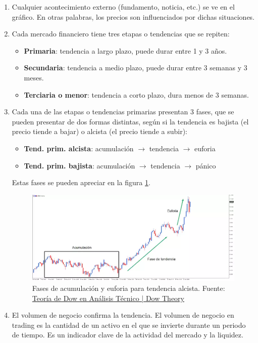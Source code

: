 \begin{enumerate}
	\item Cualquier acontecimiento externo (fundamento, noticia, etc.) se ve en el gráfico. En otras palabras, los precios son influenciados por dichas situaciones.
	\item Cada mercado financiero tiene tres etapas o tendencias que se repiten:
	\begin{itemize}
		\item \textbf{Primaria}: tendencia a largo plazo, puede durar entre 1 y 3 años.
		\item \textbf{Secundaria}: tendencia a medio plazo, puede durar entre 3 semanas y 3 meses.
		\item \textbf{Terciaria o menor}: tendencia a corto plazo, dura menos de 3 semanas.
	\end{itemize} 
	\item Cada una de las etapas o tendencias primarias presentan 3 fases, que se pueden presentar de dos formas distintas, según si la tendencia es bajista (el precio tiende a bajar) o alcista (el precio tiende a subir):
	\begin{itemize}
		\item \textbf{Tend. prim. alcista}: acumulación $\rightarrow$ tendencia $\rightarrow$ euforia
		\item \textbf{Tend. prim. bajista}: acumulación $\rightarrow$ tendencia $\rightarrow$ pánico	
	\end{itemize} 
	Estas fases se pueden apreciar en la figura \ref{fases_dow}. \newline
	\begin{figure}[h]
		\includegraphics[width=1\textwidth]{imagenes/fases_dow.png} 
		\caption{Fases de acumulación y euforia para tendencia alcista. Fuente: \color{blue} \href{https://admiralmarkets.com/es/education/articles/forex-indicators/teoria-dow}{Teoría de Dow en Análisis Técnico | Dow Theory}} \label{fases_dow}
	\end{figure} \newline
	\item El volumen de negocio confirma la tendencia. El volumen de negocio en trading es la cantidad de un activo en el que se invierte durante un periodo de tiempo. Es un indicador clave de la actividad del mercado y la liquidez.

\end{enumerate}
